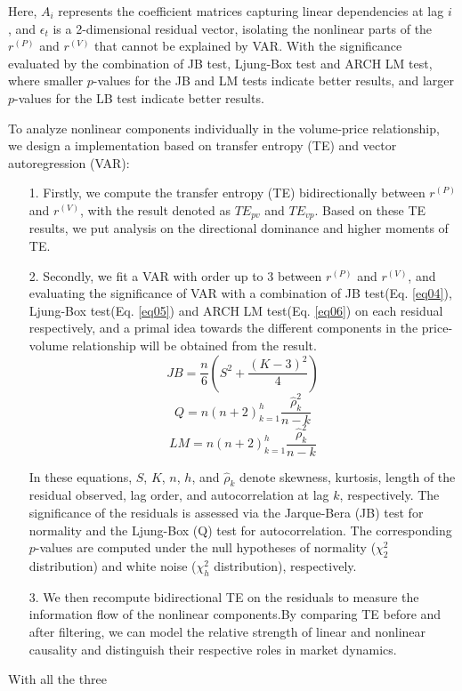 \documentclass{elsarticle}
\def\sum{}%
\def\rightarrow{}%
\begin{document}
  Here, $A_i$ represents the coefficient matrices capturing linear dependencies at lag $i$ , and $\epsilon_t$ is a 2-dimensional residual vector, isolating the nonlinear parts of the $r^{(P)}$ and $r^{(V)}$ that cannot be explained by VAR. With the significance evaluated by the combination of JB test, Ljung-Box test and ARCH LM test, where smaller $p$-values for the JB and LM tests indicate better results, and larger $p$-values for the LB test indicate better results.
  
  To analyze nonlinear components individually in the volume-price relationship, we design a implementation based on transfer entropy (TE) and vector autoregression (VAR):
\begin{itemize}
  \item[1.] Firstly, we compute the transfer entropy (TE) bidirectionally between $r^{(P)}$ and $r^{(V)}$, with the result denoted as $TE_{p\rightarrow v}$ and $TE_{v\rightarrow p}$. Based on these TE results, we put analysis on the directional dominance and higher moments of TE.
  \item[2.] Secondly, we fit a VAR with order up to 3 between $r^{(P)}$ and $r^{(V)}$, and evaluating the significance of VAR with a combination of JB test(Eq. \ref{eq04}), Ljung-Box test(Eq. \ref{eq05}) and ARCH LM test(Eq. \ref{eq06}) on each residual respectively, and a primal idea towards the different components in the price-volume relationship will be obtained from the result.
  \begin{equation} \label{eq04}
    JB = \frac{n}{6} \left( S^2 + \frac{(K - 3)^2}{4} \right)
  \end{equation}
  \begin{equation} \label{eq05}
    Q = n(n+2) \sum_{k=1}^{h} \frac{\hat{\rho}_k^2}{n - k}
  \end{equation}
  \begin{equation} \label{eq06}
    LM = n(n+2) \sum_{k=1}^{h} \frac{\hat{\rho}_k^2}{n - k}
  \end{equation}

  In these equations, $S$, $K$, $n$, $h$, and \(\hat{\rho}_k\) denote skewness, kurtosis, length of the residual observed, lag order, and autocorrelation at lag $k$, respectively. The significance of the residuals is assessed via the Jarque-Bera (JB) test for normality and the Ljung-Box (Q) test for autocorrelation. The corresponding $p$-values are computed under the null hypotheses of normality ($\chi^2_2$ distribution) and white noise ($\chi^2_h$ distribution), respectively.
  \item[3.] We then recompute bidirectional TE on the residuals to measure the information flow of the nonlinear components.By comparing TE before and after filtering, we can model the relative strength of linear and nonlinear causality and distinguish their respective roles in market dynamics. 
\end{itemize}
With all the three 
\end{document}
